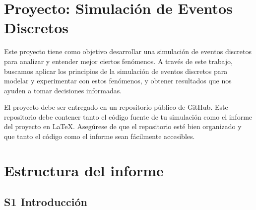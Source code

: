 \documentclass[
]{article}
\author{}
\date{}
\begin{document}
\hypertarget{proyecto-simulaciuxf3n-de-eventos-discretos}{%
\section{Proyecto: Simulación de Eventos
Discretos}\label{proyecto-simulaciuxf3n-de-eventos-discretos}}

Este proyecto tiene como objetivo desarrollar una simulación de eventos
discretos para analizar y entender mejor ciertos fenómenos. A través de
este trabajo, buscamos aplicar los principios de la simulación de
eventos discretos para modelar y experimentar con estos fenómenos, y
obtener resultados que nos ayuden a tomar decisiones informadas.

El proyecto debe ser entregado en un repositorio público de GitHub. Este
repositorio debe contener tanto el código fuente de tu simulación como
el informe del proyecto en LaTeX. Asegúrese de que el repositorio esté
bien organizado y que tanto el código como el informe sean fácilmente
accesibles.

\hypertarget{estructura-del-informe}{%
\section{Estructura del informe}\label{estructura-del-informe}}

\hypertarget{s1-introducciuxf3n}{%
\subsection{S1 Introducción}\label{s1-introducciuxf3n}}
\end{document}
